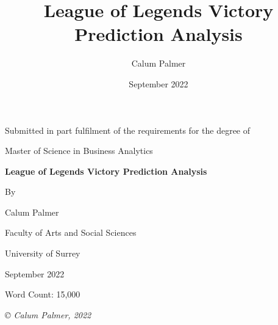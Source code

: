 \documentclass[12pt,a4 paper]{report}
\title{League of Legends Victory Prediction Analysis}
\author{Calum Palmer}
\date{September 2022}
\begin{document}
    \begin{titlepage}
    \centering
        {\large Submitted in part fulfilment of the requirements for the degree of}


        {\Large Master of Science in Business Analytics}

    \vspace{2cm}
        {\huge\bfseries League of Legends Victory Prediction Analysis}

    \vspace{1.5cm}
        {By}

    \vspace{0.5cm}
        {\Large Calum Palmer}

    \vspace{5cm}
        {\large Faculty of Arts and Social Sciences}

    \vspace{0.25cm}
        {\large University of Surrey}

    \vspace{1cm}
        {\large September 2022}

    \vspace{1.5cm}
        {\large Word Count: 15,000}

    \vfill
        {\itshape © Calum Palmer, 2022}

    \end{titlepage}

    \setcounter{page}{2}

    



    

    \tableofcontents
    \listoffigures
    \listoftables
    \newpage
\end{document}
